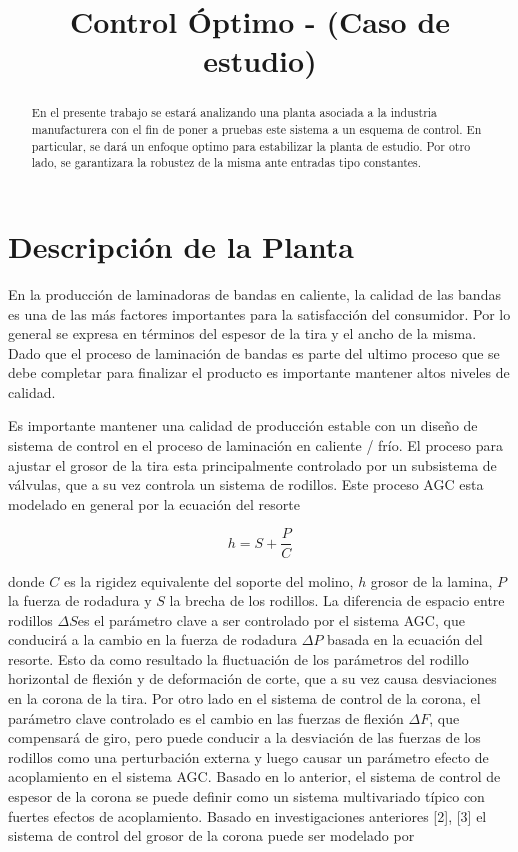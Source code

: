 \documentclass[journal,twoside,web]{ieeecolor}
\begin{document}
	
\title{Control Óptimo - (Caso de estudio)}
\maketitle

\begin{abstract}
En el presente trabajo se estará analizando una planta asociada a la industria manufacturera con el fin de poner a pruebas este sistema a un esquema de control. En particular, se dará un enfoque optimo para estabilizar la planta de estudio. Por otro lado, se garantizara la robustez de la misma ante entradas tipo constantes.
\end{abstract}


\section{Descripción de la Planta}
En la producción de laminadoras de bandas en caliente, la calidad de las bandas es una de las más factores importantes para la satisfacción del consumidor. Por lo general se expresa en términos del espesor de la tira y el ancho de la misma. Dado que el proceso de laminación de bandas es parte del ultimo proceso que se debe completar para finalizar el producto es importante mantener altos niveles de calidad.

Es importante mantener una calidad de producción estable con un diseño de sistema de control en el proceso de laminación en caliente / frío. El proceso para ajustar el grosor de la tira esta principalmente controlado por un subsistema de válvulas, que a su vez controla un sistema de rodillos. Este proceso AGC esta modelado en general por la  ecuación del resorte

\begin{equation}
	h = S + \frac{P}{C}
\end{equation}

donde $C$ es la rigidez equivalente del soporte del molino, $h$ grosor de la lamina, $P$ la fuerza de rodadura y $S$ la brecha de los rodillos. La diferencia de espacio entre rodillos $\Delta S$es el parámetro clave a ser controlado por el sistema AGC, que conducirá a la cambio en la fuerza de rodadura $\Delta P$ basada en la ecuación del resorte. Esto da como resultado la fluctuación de los parámetros del rodillo horizontal de flexión y de deformación de corte, que a su vez causa desviaciones en la corona de la tira. Por otro lado en el sistema de control de la corona, el parámetro clave controlado es el cambio en las fuerzas de flexión $\Delta F$, que compensará de giro, pero puede conducir a la desviación de las fuerzas de los rodillos como una perturbación externa y luego causar un parámetro efecto de acoplamiento en el sistema AGC. Basado en lo anterior, el sistema de control de espesor de la corona se puede definir como un sistema multivariado típico con fuertes efectos de acoplamiento. Basado en investigaciones anteriores [2], [3] el sistema de control del grosor de la corona puede ser modelado por
\end{document}
